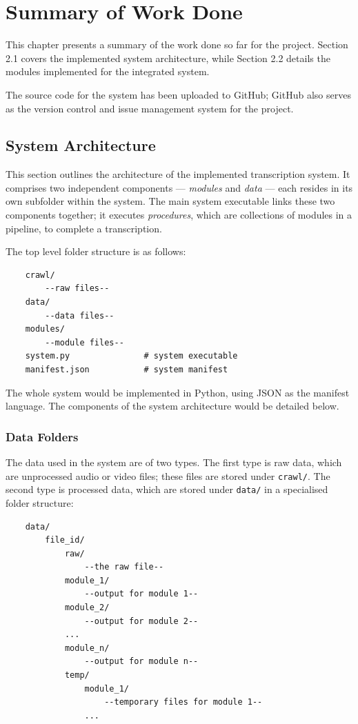 \chapter{Summary of Work Done}

This chapter presents a summary of the work done so far for the project. Section 2.1 covers the implemented system architecture, while Section 2.2 details the modules implemented for the integrated system.

The source code for the system has been uploaded to GitHub; GitHub also serves as the version control and issue management system for the project.

\section{System Architecture}

This section outlines the architecture of the implemented transcription system. It comprises two independent components --- \textit{modules} and \textit{data} --- each resides in its own subfolder within the system. The main system executable links these two components together; it executes \textit{procedures}, which are collections of modules in a pipeline, to complete a transcription.

The top level folder structure is as follows:

\begin{lstlisting}
    crawl/
        --raw files--
    data/
        --data files--
    modules/
        --module files--
    system.py               # system executable
    manifest.json           # system manifest
\end{lstlisting}

The whole system would be implemented in Python, using JSON as the manifest language. The components of the system architecture would be detailed below.

\subsection{Data Folders}

The data used in the system are of two types. The first type is raw data, which are unprocessed audio or video files; these files are stored under \texttt{crawl/}. The second type is processed data, which are stored under \texttt{data/} in a specialised folder structure:

\begin{lstlisting}
    data/
        file_id/
            raw/
                --the raw file--
            module_1/
                --output for module 1--
            module_2/
                --output for module 2--
            ...
            module_n/
                --output for module n--
            temp/
                module_1/
                    --temporary files for module 1--
                ...
\end{lstlisting}

